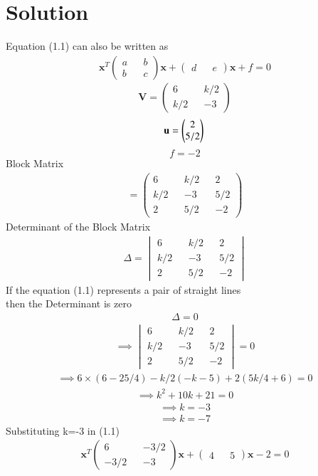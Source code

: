 \documentclass[journal,13pt,twocolumn]{IEEEtran}
\newcommand{\myvec}[1]{\ensuremath{\begin{pmatrix}#1\end{pmatrix}}}
\newcommand{\mydet}[1]{\ensuremath{\begin{vmatrix}#1\end{vmatrix}}}
\renewcommand{\vec}[1]{\mathbf{#1}}
\begin{document}
\section{\textbf{Solution}}
Equation (1.1) can also be written as 
\begin{align}
\vec{x}^T \myvec{a && b \\ b && c} \vec{x} + \myvec{d && e}\vec{x} + f = 0
\end{align}
\begin{equation}
\vec{V}=\myvec{6 && k/2\\ k/2 && -3}
\end{equation}
\begin{equation}
\vec{u}=\myvec{2\\5/2}\\
\end{equation}
\begin{equation}
f= -2
\end{equation}
Block Matrix
\begin{align}
 = \myvec{6 && k/2 && 2\\ k/2 && -3 && 5/2\\2 && 5/2 && -2}
\end{align}
Determinant of the Block Matrix
\begin{align}
\Delta = \mydet{6 && k/2 && 2\\ k/2 && -3 && 5/2\\2 && 5/2 && -2}
\end{align}
If the equation (1.1) represents a pair of straight lines\\
then the Determinant is zero
\begin{align}
\Delta = 0
\end{align}
\begin{align}
\implies \mydet{6 && k/2 && 2\\ k/2 && -3 && 5/2\\2 && 5/2 && -2} = 0
\end{align}
\begin{align}
\implies 6\times(6-25/4)-k/2(-k-5)+2(5k/4+6) = 0
\end{align}
\begin{align}
\implies k^2 + 10k + 21 = 0
\end{align}
\begin{align}
\implies \boxed{ k = -3 }
\end{align}
\begin{align}
\implies \boxed{ k = -7 }
\end{align}
Substituting k=-3 in (1.1)
\begin{align}
\vec{x}^T \myvec{6 && -3/2 \\ -3/2 && -3} \vec{x} + \myvec{4 && 5}\vec{x} -2 = 0
\end{align}
\end{document}
